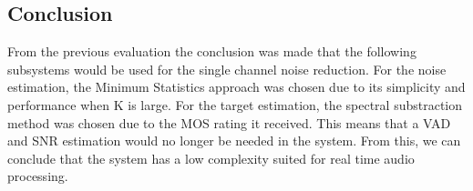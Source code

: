 \subsection{Conclusion}
From the previous evaluation the conclusion was made that the following subsystems would be used for the single channel noise reduction. For the noise estimation, the Minimum Statistics approach was chosen due to its simplicity and performance when K is large. For the target estimation, the spectral substraction method was chosen due to the MOS rating it received. This means that a VAD and SNR estimation would no longer be needed in the system. From this, we can conclude that the system has a low complexity suited for real time audio processing.
